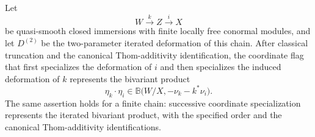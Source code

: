 \begin{lemma}
\label{lem:successive-specialization-product}
Let
\[
    W\xrightarrow{k}Z\xrightarrow{i}X
\]
be quasi-smooth closed immersions with finite locally free conormal modules,
and let \(D^{(2)}\) be the two-parameter iterated deformation of this
chain.  After classical truncation and the canonical Thom-additivity
identification, the coordinate flag that first specializes the deformation
of \(i\) and then specializes the induced deformation of \(k\) represents
the bivariant product
\[
    \eta_k\cdot\eta_i
    \in
    \mathbb B
    \bigl(
      W/X,
      -\nu_k-k^*\nu_i
    \bigr).
\]
The same assertion holds for a finite chain: successive coordinate
specialization represents the iterated bivariant product, with the
specified order and the canonical Thom-additivity identifications.
\end{lemma}

